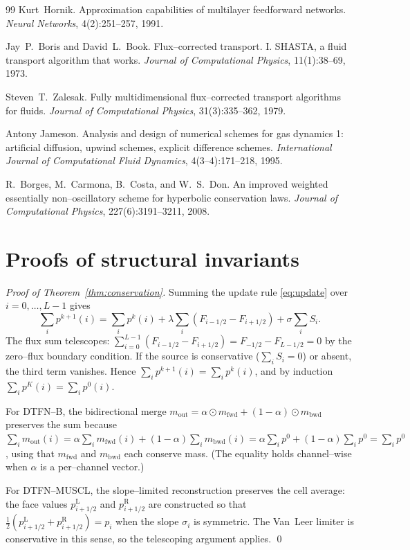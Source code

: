 \documentclass[10pt]{article}
\theoremstyle{definition}
\theoremstyle{remark}
\begin{document}
\begin{thebibliography}{99}
Kurt~Hornik.
\newblock Approximation capabilities of multilayer feedforward networks.
\newblock \emph{Neural Networks}, 4(2):251--257, 1991.

Jay~P.~Boris and David~L.~Book.
\newblock Flux--corrected transport. I. SHASTA, a fluid transport
  algorithm that works.
\newblock \emph{Journal of Computational Physics}, 11(1):38--69, 1973.

Steven~T.~Zalesak.
\newblock Fully multidimensional flux--corrected transport algorithms
  for fluids.
\newblock \emph{Journal of Computational Physics}, 31(3):335--362, 1979.

 Antony Jameson.
\newblock Analysis and design of numerical schemes for gas dynamics 1:
  artificial diffusion, upwind schemes, explicit difference
  schemes.
\newblock \emph{International Journal of Computational Fluid
  Dynamics}, 4(3--4):171--218, 1995.

R.~Borges, M.~Carmona, B.~Costa, and W.~S.~Don.
\newblock An improved weighted essentially non--oscillatory scheme for
  hyperbolic conservation laws.
\newblock \emph{Journal of Computational Physics}, 227(6):3191--3211,
  2008.
\end{thebibliography}

\appendix

\section{Proofs of structural invariants}
\label{app:proofs}

\begin{proof}[Proof of Theorem~\ref{thm:conservation}]
  Summing the update rule \eqref{eq:update} over $i=0,\dots,L-1$ gives
  \[
    \sum_i p^{k+1}(i) = \sum_i p^k(i) + \lambda \sum_i (F_{i-1/2} - F_{i+1/2}) + \sigma \sum_i S_i.
  \]
  The flux sum telescopes:
  $\sum_{i=0}^{L-1} (F_{i-1/2} - F_{i+1/2}) = F_{-1/2} - F_{L-1/2} = 0$
  by the zero--flux boundary condition.  If the source is conservative
  ($\sum_i S_i = 0$) or absent, the third term vanishes.  Hence
  $\sum_i p^{k+1}(i) = \sum_i p^k(i)$, and by induction
  $\sum_i p^K(i) = \sum_i p^0(i)$.

  For DTFN--B, the bidirectional merge
  $m_\text{out} = \alpha \odot m_\text{fwd} + (1-\alpha) \odot m_\text{bwd}$
  preserves the sum because
  $\sum_i m_\text{out}(i) = \alpha \sum_i m_\text{fwd}(i) + (1-\alpha) \sum_i m_\text{bwd}(i) = \alpha \sum_i p^0 + (1-\alpha) \sum_i p^0 = \sum_i p^0$,
  using that $m_\text{fwd}$ and $m_\text{bwd}$ each conserve mass.
  (The equality holds channel--wise when $\alpha$ is a per--channel vector.)
  
  For DTFN--MUSCL, the slope--limited reconstruction preserves the
  cell average: the face values $p^\text{L}_{i+1/2}$ and
  $p^\text{R}_{i+1/2}$ are constructed so that
  $\tfrac{1}{2}(p^\text{L}_{i+1/2} + p^\text{R}_{i+1/2}) = p_i$ when
  the slope $\sigma_i$ is symmetric.  The Van~Leer limiter is
  conservative in this sense, so the telescoping argument applies.
  \qed
\end{proof}
\end{document}
